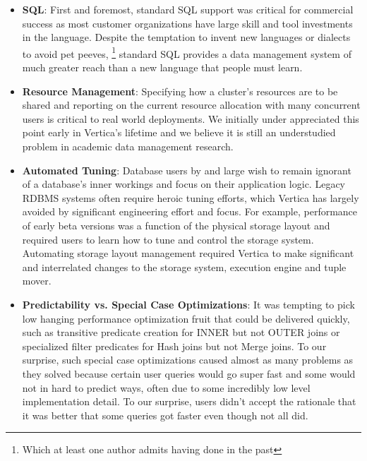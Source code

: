 \documentclass[a4paper,12pt,notitlepage,twoside,openright]{article}
\begin{document}
\begin{itemize}
\item

  \textbf{SQL}: First and foremost, standard SQL support was critical
  for commercial success as most customer organizations have large skill
  and tool investments in the language. Despite the temptation to invent
  new languages or dialects to avoid pet peeves, \footnote{Which at
    least one author admits having done in the past} standard SQL
  provides a data management system of much greater reach than a new
  language that people must learn.

\item

  \textbf{Resource Management}: Specifying how a cluster's resources are
  to be shared and reporting on the current resource allocation with
  many concurrent users is critical to real world deployments. We
  initially under appreciated this point early in Vertica's lifetime and
  we believe it is still an understudied problem in academic data
  management research.

\item

  \textbf{Automated Tuning}: Database users by and large wish to remain
  ignorant of a database's inner workings and focus on their application
  logic. Legacy RDBMS systems often require heroic tuning efforts, which
  Vertica has largely avoided by significant engineering effort and
  focus. For example, performance of early beta versions was a function
  of the physical storage layout and required users to learn how to tune
  and control the storage system. Automating storage layout management
  required Vertica to make significant and interrelated changes to the
  storage system, execution engine and tuple mover.

\item

  \textbf{Predictability vs. Special Case Optimizations}: It was
  tempting to pick low hanging performance optimization fruit that could
  be delivered quickly, such as transitive predicate creation for INNER
  but not OUTER joins or specialized filter predicates for Hash joins
  but not Merge joins. To our surprise, such special case optimizations
  caused almost as many problems as they solved because certain user
  queries would go super fast and some would not in hard to predict
  ways, often due to some incredibly low level implementation detail. To
  our surprise, users didn't accept the rationale that it was better
  that some queries got faster even though not all did.


\end{itemize}
\end{document}
